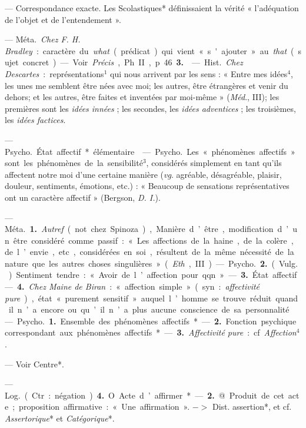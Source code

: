\begin{itemize}[leftmargin=1cm, label=, itemsep=1pt]
 — Correspondance exacte.
Les Scolastiques* définissaient la
vérité « l'adéquation de l’objet et de
l'entendement ».

 — \si{Méta.} {\it Chez F. H. Bradley} :
caractère du {\it what} (prédicat) qui
vient «s'ajouter » au {\it that} (sujet concret). — Voir {\it Précis}, Ph. II, p. 46 {\bf 3.}

 — \si{Hist.} {\it Chez Descartes} : représentations$^1$ qui nous
arrivent par les sens : « Entre mes
idées$^4$, les unes me semblent être
nées avec moi; les autres, être étrangères et venir du dehors; et les
autres, être faites et inventées par
moi-même » ({\it Méd}., III); les premières sont les {\it idées innées} ; les
secondes, les {\it idées adventices} ; les
troisièmes, les {\it idées factices}.

 — \si{Psycho.} État affectif*
élémentaire.

 — \si{Psycho.} Les « phénomènes
affectifs » sont les phénomènes de la
sensibilité$^3$, considérés simplement
en tant qu'ils affectent notre moi
d’une certaine manière ({\it vg}. agréable,
désagréable, plaisir, douleur, sentiments, émotions, etc.) : « Beaucoup
de sensations représentatives ont un
caractère affectif » (Bergson, {\it D. I.}).

 — \si{Méta.} {\bf 1.} {\it Autref}. (not.
chez Spinoza), Manière d’être, modification d’un être considéré comme
passif : « Les affections de la haine,
de la colère, de l’envie, etc., considérées en soi, résultent de la même
nécessité de la nature que les autres
choses singulières » ({\it Eth}., III).

— \si{Psycho.} {\bf 2.} (\si{Vulg.}) Sentiment
tendre : « Avoir de l’affection pour
qqn ». — {\bf 3.} État affectif. — {\bf 4.} {\it Chez
Maine de Biran} : « affection simple »
(syn. : {\it affectivité pure}), état « purement sensitif » auquel l’homme se
trouve réduit quand il n’a encore ou
qu’il n’a plus aucune conscience de
sa personnalité.

 — \si{Psycho.} {\bf 1.} Ensemble
des phénomènes affectifs*. — {\bf 2.}
Fonction psychique correspondant
aux phénomènes affectifs*. — {\bf 3.}
{\it Affectivité pure} : cf. {\it Affection}$^4$.

 — Voir Centre*.

 — \si{Log.} (Ctr. : négation).
 {\bf 4.} O Acte d’affirmer*. — {\bf 2.} @ Produit de cet acte ;
proposition affirmative : « Une affirmation ».
$->$ Dist. assertion*, et cf. {\it Assertorique}* et {\it Catégorique}*.


\end{itemize}
